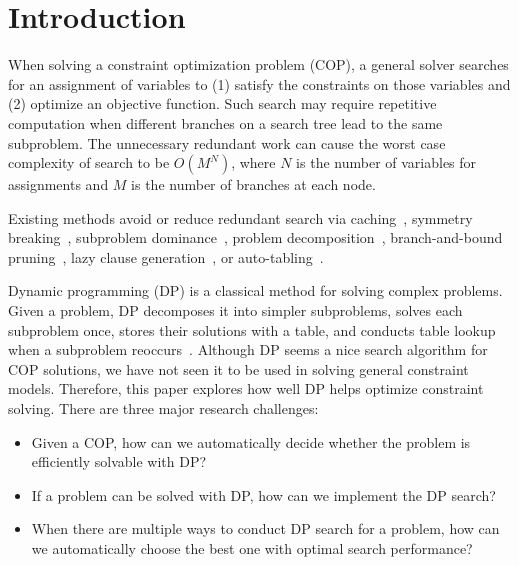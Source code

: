 \section{Introduction}
When solving a constraint optimization problem (COP), a general solver searches for an assignment of variables to (1) satisfy the constraints on those variables and (2) optimize an objective function. Such search may require repetitive computation when different branches on a search tree lead to the same subproblem. The unnecessary redundant work can cause the worst case complexity of search to be $O(M^N)$, where $N$ is the number of variables for assignments and $M$ is the number of branches at each node. 

Existing methods avoid or reduce redundant search via caching~\cite{Smith2005}, symmetry breaking~\cite{Gent2006}, subproblem dominance~\cite{chu2012exploiting}, problem  decomposition~\cite{kitching2007symmetric}, branch-and-bound pruning~\cite{marinescu2005and}, lazy clause generation~\cite{ohrimenko2009propagation}, or auto-tabling~\cite{dekker2017auto,zhou2015constraint}.

Dynamic programming (DP) is 
a classical method for solving complex problems. 
Given a problem, DP decomposes it into simpler subproblems, solves each subproblem once, stores their solutions with a table, and conducts table lookup when a subproblem reoccurs~\cite{Bertsekas:2000}. 
Although DP seems a nice search algorithm for COP solutions, we have not seen it to be used in solving general constraint models. 
Therefore, this paper explores how well DP helps optimize constraint solving. 
There are three major research challenges: 


\begin{itemize}
    \item Given a COP, how can we automatically decide whether the problem is efficiently solvable with DP? 
    \item If a problem can be solved with DP, how can we implement the DP search?
    \item When there are multiple ways to conduct DP search for a problem, how can we automatically choose the best one with optimal search performance? 
\end{itemize}

